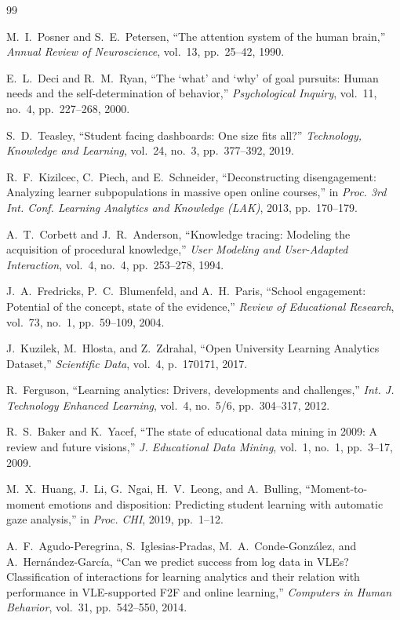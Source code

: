 \documentclass[conference]{IEEEtran}
\begin{document}
\begin{thebibliography}{99}

M.~I.~Posner and S.~E.~Petersen, ``The attention system of the human brain,''
\textit{Annual Review of Neuroscience}, vol.~13, pp.~25--42, 1990.

E.~L.~Deci and R.~M.~Ryan, ``The `what' and `why' of goal pursuits: Human
needs and the self-determination of behavior,''
\textit{Psychological Inquiry}, vol.~11, no.~4, pp.~227--268, 2000.

S.~D.~Teasley, ``Student facing dashboards: One size fits all?''
\textit{Technology, Knowledge and Learning}, vol.~24, no.~3,
pp.~377--392, 2019.

R.~F.~Kizilcec, C.~Piech, and E.~Schneider,
``Deconstructing disengagement: Analyzing learner subpopulations in massive
open online courses,'' in \textit{Proc. 3rd Int. Conf. Learning Analytics
and Knowledge (LAK)}, 2013, pp.~170--179.

A.~T.~Corbett and J.~R.~Anderson, ``Knowledge tracing: Modeling the
acquisition of procedural knowledge,'' \textit{User Modeling and
User-Adapted Interaction}, vol.~4, no.~4, pp.~253--278, 1994.

J.~A.~Fredricks, P.~C.~Blumenfeld, and A.~H.~Paris, ``School engagement:
Potential of the concept, state of the evidence,''
\textit{Review of Educational Research}, vol.~73, no.~1, pp.~59--109, 2004.

J.~Kuzilek, M.~Hlosta, and Z.~Zdrahal, ``Open University Learning Analytics
Dataset,'' \textit{Scientific Data}, vol.~4, p.~170171, 2017.

R.~Ferguson, ``Learning analytics: Drivers, developments and challenges,''
\textit{Int. J. Technology Enhanced Learning}, vol.~4, no.~5/6,
pp.~304--317, 2012.

R.~S.~Baker and K.~Yacef, ``The state of educational data mining in 2009:
A review and future visions,'' \textit{J. Educational Data Mining},
vol.~1, no.~1, pp.~3--17, 2009.

M.~X.~Huang, J.~Li, G.~Ngai, H.~V.~Leong, and A.~Bulling,
``Moment-to-moment emotions and disposition: Predicting student learning with
automatic gaze analysis,'' in \textit{Proc. CHI}, 2019, pp.~1--12.

A.~F.~Agudo-Peregrina, S.~Iglesias-Pradas, M.~A.~Conde-Gonz\'{a}lez,
and A.~Hern\'{a}ndez-Garc\'{i}a, ``Can we predict success from log data in
VLEs? Classification of interactions for learning analytics and their
relation with performance in VLE-supported F2F and online learning,''
\textit{Computers in Human Behavior}, vol.~31, pp.~542--550, 2014.


\end{thebibliography}
\end{document}
